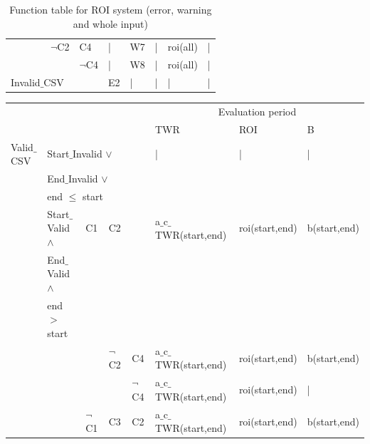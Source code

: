 \documentclass[runningheads,12pt]{article}
\begin{document}
\begin{landscape}
\begin{table}
\begin{tabular}{|l|l|l|l|l|l||l|l|l|l|l|}
\cline{5-11}
& & & & $\lnot$C2 & C4 & | & W7 & | & roi(all) & |\\

\cline{6-11}
& & & & & $\lnot$C4 & | & W8 & | & roi(all) & |\\

\hline
\multicolumn{6}{|l||}{Invalid$\_$CSV} & E2 & | & | & | & |\\ 


\hline
\end{tabular}
\caption{Function table for ROI system (error, warning and whole input)}
\label{table:table_ROI}
\end{table}
\end{landscape}




\newpage
\begin{landscape}
\begin{table}
\centering

\begin{tabular}{|l|l|l|l|l|l||l|l|l|}
\hline
\multicolumn{6}{|c||}{} & \multicolumn{3}{|c|}{Evaluation period}\\ 

\multicolumn{6}{|c||}{} & TWR & ROI & B\\ 


\hline
Valid$\_$CSV & \multicolumn{5}{|l||}{Start$\_$Invalid $\vee$ } & | & | & |\\ 
& \multicolumn{5}{|l||}{End$\_$Invalid $\vee$} & &&\\
& \multicolumn{5}{|l||}{end $\le$ start}& & &\\

\cline{2-9}
& Start$\_$Valid  $\wedge$ & C1 & \multicolumn{3}{|l||}{C2} & a$\_$c$\_$TWR(start,end) & roi(start,end) & b(start,end)\\
& End$\_$Valid $\wedge$& &\multicolumn{3}{|l||}{}&&&\\
& end$>$start &&\multicolumn{3}{|l||}{}&&&\\

\cline{4-9}
& & & $\lnot$C2 &\multicolumn{2}{|l||}{C4} & a$\_$c$\_$TWR(start,end) & roi(start,end) & b(start,end)\\

\cline{5-9}
& & & &\multicolumn{2}{|l||}{$\lnot$C4} & a$\_$c$\_$TWR(start,end) & roi(start,end) & |\\

\cline{3-9}
& & $\lnot$C1 & C3 &\multicolumn{2}{|l||}{C2} & a$\_$c$\_$TWR(start,end) & roi(start,end) & b(start,end)\\


\end{tabular}
\end{table}
\end{landscape}
\end{document}
